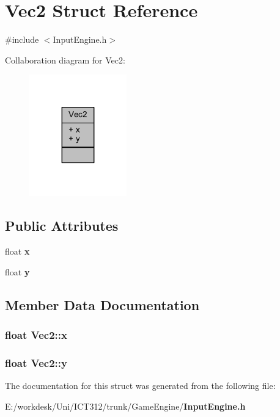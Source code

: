 \section{Vec2 Struct Reference}
\label{struct_vec2}


{\ttfamily \#include $<$Input\+Engine.\+h$>$}



Collaboration diagram for Vec2\+:\nopagebreak
\begin{figure}[H]
\begin{center}
\leavevmode
\includegraphics[width=119pt]{d3/dd6/struct_vec2__coll__graph}
\end{center}
\end{figure}
\subsection*{Public Attributes}
\begin{DoxyCompactItemize}
\item 
float {\bf x}
\item 
float {\bf y}
\end{DoxyCompactItemize}


\subsection{Member Data Documentation}
\subsubsection[{x}]{\setlength{\rightskip}{0pt plus 5cm}float Vec2\+::x}\label{struct_vec2_adf8ee322d4b4bcc04146762c018d731f}
\subsubsection[{y}]{\setlength{\rightskip}{0pt plus 5cm}float Vec2\+::y}\label{struct_vec2_a30543787e62f6d915543cf1dfb04c094}


The documentation for this struct was generated from the following file\+:\begin{DoxyCompactItemize}
\item 
E\+:/workdesk/\+Uni/\+I\+C\+T312/trunk/\+Game\+Engine/{\bf Input\+Engine.\+h}\end{DoxyCompactItemize}
